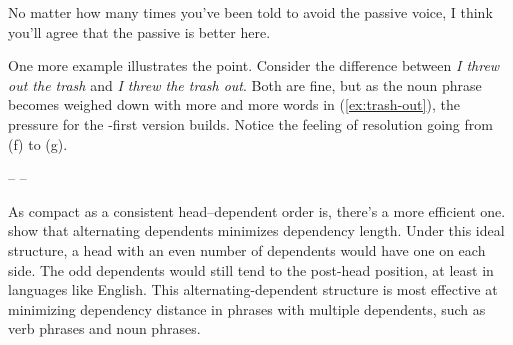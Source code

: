 \ea\label{ex:CNN}
    \z
\z

\noindent No matter how many times you've been told to avoid the passive voice, I think you'll agree that the passive is better here.

One more example illustrates the point. Consider the difference between \textit{I threw out the trash} and \textit{I threw the trash out}. Both are fine, but as the  noun phrase becomes weighed down with more and more words in (\ref{ex:trash-out}), the pressure for the -first version builds. Notice the feeling of resolution going from (f) to (g).

\ea \label{ex:trash-out}
    \z
\z

\begin{center}
-- --
\end{center}

\noindent As compact as a consistent head–dependent order is, 
there's a more efficient one. \citet{Gildea2007} show that alternating dependents minimizes dependency length. Under this ideal structure, a head with an even number of dependents would have one on each side. The odd dependents would still tend to the post-head position, at least in languages like English. This alternating-dependent structure is most effective at minimizing dependency distance in phrases with multiple dependents, such as verb phrases and noun phrases.

